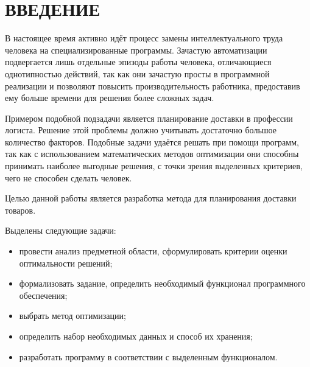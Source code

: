 \section*{ВВЕДЕНИЕ}

В настоящее время активно идёт процесс замены интеллектуального труда человека на специализированные программы. Зачастую автоматизации подвергается лишь отдельные эпизоды работы человека, отличающиеся однотипностью действий, так как они зачастую просты в программной реализации и позволяют повысить производительность работника, предоставив ему больше времени для решения более сложных задач.

Примером подобной подзадачи является планирование доставки в профессии логиста. Решение этой проблемы должно учитывать достаточно большое количество факторов. Подобные задачи удаётся решать при помощи программ, так как с использованием математических методов оптимизации они способны принимать наиболее выгодные решения, с точки зрения выделенных критериев, чего не способен сделать человек.

Целью данной работы является разработка метода для планирования доставки товаров.

Выделены следующие задачи:
\begin{itemize}
	\item провести анализ предметной области, сформулировать критерии оценки оптимальности решений;
	\item формализовать задание, определить необходимый функционал программного обеспечения;
	\item выбрать метод оптимизации;
	\item определить набор необходимых данных и способ их хранения;
	\item разработать программу в соответствии с выделенным функционалом. 
	
\end{itemize}

\pagebreak